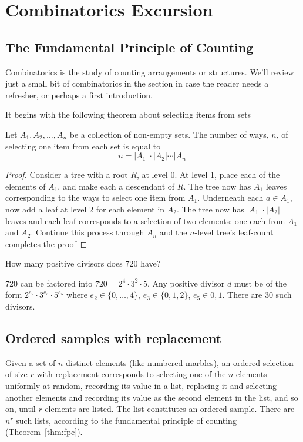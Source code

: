 \documentclass[../main.tex]{subfiles}
\begin{document}
\section{Combinatorics Excursion}
\subsection{The Fundamental Principle of Counting}
Combinatorics is the study of counting arrangements or structures. We'll 
review just a small bit of combinatorics in the section in case the
reader needs a refresher, or perhaps a first introduction.

It begins with the following theorem about selecting items from sets
\begin{theorem}
	Let $A_1, A_2, \ldots, A_n$ be a collection of non-empty sets. The
	number of ways, $n$, of selecting one item from each set is equal to
	$$n = |A_1| \cdot |A_2| \cdots |A_n|$$
	\label{thm:fpc}
\end{theorem}

\begin{proof}
	Consider a tree with a root $R$, at level 0. At level 1, place
	each of the elements of $A_1$, and make each a descendant of $R$. The tree
	now has $A_1$ leaves corresponding to the ways to select one item from $A_1$. 
	Underneath each $a \in A_1$, now add a leaf at level 2 for each element in $A_2$. The tree
	now has $|A_1| \cdot |A_2|$ leaves and each leaf corresponds to a selection of two elements: one each from $A_1$ and $A_2$. Continue this process through $A_n$ and
	the $n$-level tree's leaf-count completes the proof
\end{proof}

\begin{example}
	How many positive divisors does 720 have?
\end{example}
\begin{solution}
	720 can be factored into $720 = 2^4 \cdot 3^2 \cdot 5$. Any positive divisor $d$ must
	be of the form $2^{e_2}\cdot 3^{e_3}\cdot 5^{e_5}$ where $e_2 \in \{0,\ldots,4\}$,
	$e_3 \in \{0,1,2\}$, $e_5 \in {0,1}$. There are 30 such divisors.
\end{solution}

\subsection{Ordered samples with replacement}
Given a set of $n$ distinct elements (like numbered marbles), an
ordered selection of size $r$ with replacement corresponds to selecting
one of the $n$ elements uniformly at random, recording its value in a list,
replacing it and selecting another elements and recording its value as the 
second element in the list, and so on, until $r$ elements are listed. The list
constitutes an ordered sample. There are $n^r$ such lists, according to
the fundamental principle of counting (Theorem~\ref{thm:fpc}).
\end{document}
